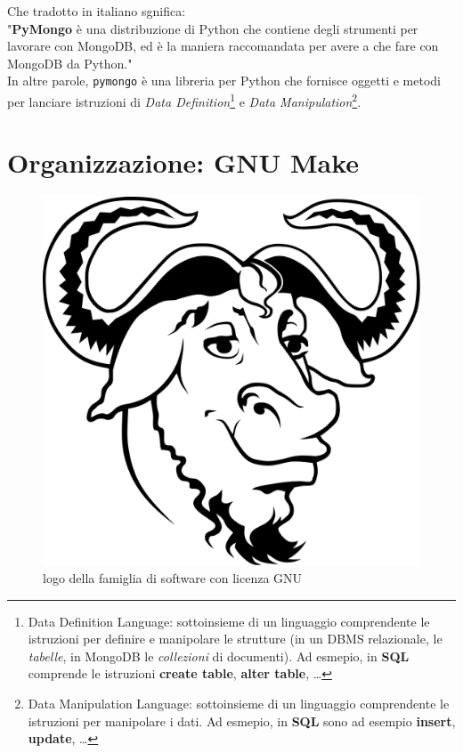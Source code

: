         Che tradotto in italiano sgnifica: \\

        "\textbf{PyMongo} è una distribuzione di Python che contiene degli strumenti per lavorare con MongoDB, ed è la maniera raccomandata per avere a che fare con MongoDB da Python." \\

        In altre parole, \texttt{pymongo} è una libreria per Python che fornisce oggetti e metodi per lanciare istruzioni di \textit{Data Definition}\footnote{Data Definition Language: sottoinsieme di un linguaggio comprendente le istruzioni per definire e manipolare le strutture (in un DBMS relazionale, le \textit{tabelle}, in MongoDB le \textit{collezioni} di documenti). Ad esmepio, in \textbf{SQL} comprende le istruzioni \textbf{create table}, \textbf{alter table}, \ldots} e \textit{Data Manipulation}\footnote{Data Manipulation Language: sottoinsieme di un linguaggio comprendente le istruzioni per manipolare i dati. Ad esmepio, in \textbf{SQL} sono ad esempio \textbf{insert}, \textbf{update}, \ldots}.

\section{Organizzazione: GNU Make}

    \begin{figure}
        \centering
        \caption{logo della famiglia di software con licenza GNU}
        \label{make}
        \includegraphics[scale=0.12]{img/gnu.png}
    \end{figure}

